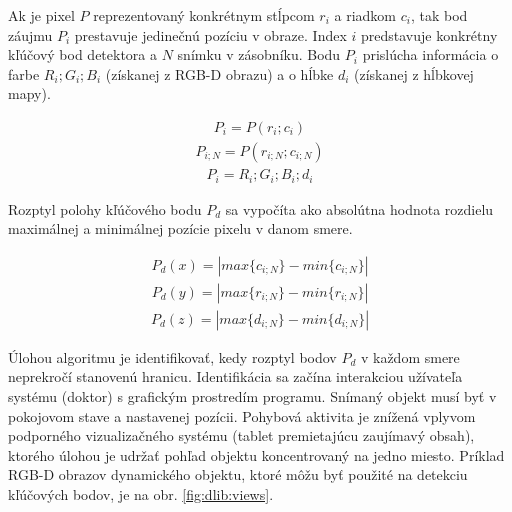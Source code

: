 Ak je pixel $P$ reprezentovaný konkrétnym stĺpcom $r_{i}$ a riadkom $c_{i}$, tak bod záujmu $P_{i}$ prestavuje jedinečnú pozíciu v obraze. Index $i$ predstavuje konkrétny kľúčový bod detektora a $N$ snímku v zásobníku. Bodu $P_{i}$ prislúcha informácia o farbe $R_{i};G_{i};B_{i}$ (získanej z RGB-D obrazu) a o hĺbke $d_{i}$ (získanej z hĺbkovej mapy).

\begin{equation}
\label{key}
\begin{aligned}
P_{i}=P\left(r_{i};c_{i}\right)
\end{aligned}
\end{equation}
\begin{equation}
\label{key}
\begin{aligned}
P_{i;N}=P\left(r_{i;N};c_{i;N}\right)
\end{aligned}
\end{equation}
\begin{equation}
\label{key}
\begin{aligned}
P_{i}=R_{i};G_{i};B_{i};d_{i}
\end{aligned}
\end{equation}

Rozptyl polohy kľúčového bodu $P_d$ sa vypočíta ako absolútna hodnota rozdielu maximálnej a minimálnej pozície pixelu v danom smere. 

\begin{equation}
\label{key}
\begin{aligned}
P_d\left(x\right)=\left|  max\lbrace c_{i;N} \rbrace -min\lbrace c_{i;N} \rbrace \right| 
\end{aligned}
\end{equation}
\begin{equation}
\label{key}
\begin{aligned}
P_d\left(y\right)=\left|  max\lbrace r_{i;N} \rbrace -min\lbrace r_{i;N} \rbrace \right| 
\end{aligned}
\end{equation}
\begin{equation}
\label{key}
\begin{aligned}
P_d\left(z\right)=\left|  max\lbrace d_{i;N} \rbrace -min\lbrace d_{i;N} \rbrace \right| 
\end{aligned}
\end{equation}

Úlohou algoritmu je identifikovať, kedy rozptyl bodov $P_d$ v každom smere neprekročí stanovenú hranicu. Identifikácia sa začína interakciou užívateľa systému (doktor) s grafickým prostredím programu. Snímaný objekt musí byť v pokojovom stave a nastavenej pozícii. Pohybová aktivita je znížená vplyvom podporného vizualizačného systému (tablet premietajúcu zaujímavý obsah), ktorého úlohou je udržať pohľad objektu koncentrovaný na jedno miesto. Príklad RGB-D obrazov dynamického objektu, ktoré môžu byť použité na detekciu kľúčových bodov, je na obr. \ref{fig:dlib:views}. 

